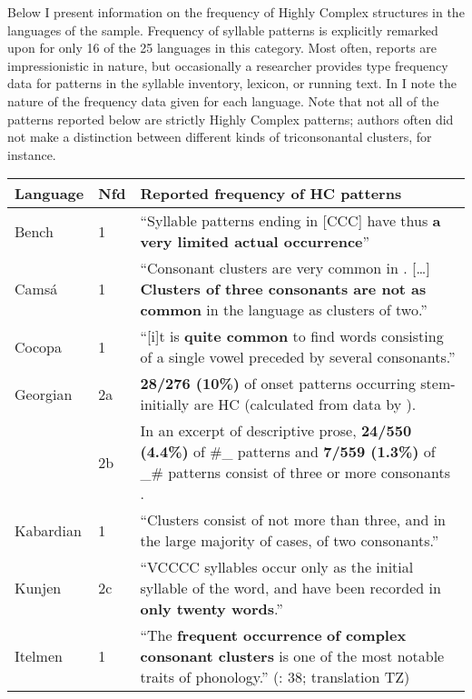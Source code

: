   Below I present information on the frequency of Highly Complex structures in the languages of the sample. Frequency of syllable patterns is explicitly remarked upon for only 16 of the 25 languages in this category. Most often, reports are impressionistic in nature, but occasionally a researcher provides type frequency data for patterns in the syllable inventory, lexicon, or running text. In  I note the nature of the frequency data given for each language. Note that not all of the patterns reported below are strictly Highly Complex patterns; authors often did not make a distinction between different kinds of triconsonantal clusters, for instance.

\begin{sidewaystable}\footnotesize
\begin{tabularx}{\textwidth}{p{1.25cm}lQ}
\lsptoprule
Language & Nfd & Reported frequency of HC patterns\\\midrule
{Bench} & 1 & “Syllable patterns ending in [CCC] have thus \textbf{{a very limited actual occurrence}}” \citep[92]{Rapold2006}\\
{Camsá} & 1 & “Consonant clusters are very common in . […] \textbf{{Clusters of three consonants are not as common}} in the language as clusters of two.” \citep[81-4]{Howard1967}\\
{Cocopa} & 1 & “[i]t is \textbf{{quite common}} to find  words consisting of a single vowel preceded by several consonants.” \citep[1]{Bendixen1980}\\
{Georgian} & 2a & \textbf{{28/276 (10\%)}} of onset patterns occurring stem-initially are HC (calculated from data by \citealt[197--205]{Butskhrikidze2002}).\\
            & 2b & In an excerpt of descriptive prose, \textbf{{24/550 (4.4\%)}} of \#\_ patterns and \textbf{{7/559 (1.3\%)}} of \_\# patterns consist of three or more consonants \citep[79-80]{Vogt1958}.\\
{Kabardian} & 1 & “Clusters consist of not more than three, and in the large majority of cases, of two consonants.” \citep[29]{Kuipers1960}\\
{Kunjen} & 2c & “VCCCC syllables occur only as the initial syllable of the word, and have been recorded in \textbf{{only twenty words}}.” \citep[35]{Sommer1969}\\
{Itelmen} & 1 & “The \textbf{{frequent occurrence}} \textbf{{of complex consonant clusters}} is one of the most notable traits of  phonology.” (\citealt{GeorgVolodin1999}: 38; translation TZ)\\

\end{tabularx}
\end{sidewaystable}
